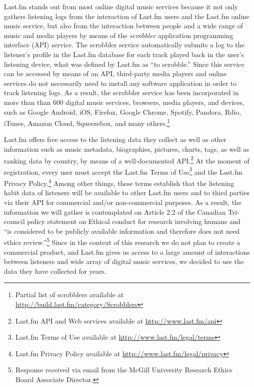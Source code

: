 Last.fm stands out from most online digital music services because it not only gathers listening logs from the interaction of Last.fm users and the Last.fm online music service, 
but also from the interaction between people and a wide range of music and media players by means of the \emph{scrobbler} application programming interface (API) service. 
The scrobbler service automatically submits a log to the listener's profile in the Last.fm database for each track played back in the user's listening device, what was defined by Last.fm as ``to scrobble.'' 
Since this service can be accessed by means of an API, third-party media players and online services do not necessarily need to install any software application in order to track listening logs.
As a result, the scrobbler service has been incorporated in more than than 600 digital music services, browsers, media players, and devices, such as Google Android, iOS,  Firefox, Google Chrome, Spotify, Pandora, Rdio, iTunes, Amazon Cloud, Squeezebox, and many others.\footnote{Partial list of scrobblers available at \url{http://build.last.fm/category/Scrobblers}} 

Last.fm offers free access to the listening data they collect as well as other information such as music metadata, biographies, pictures, charts, tags, as well as ranking data by country, by means of a well-documented API.\footnote{Last.fm API and Web services available at \url{http://www.last.fm/api}} 
At the moment of registration, every user must accept the Last.fm Terms of Use\footnote{Last.fm Terms of Use available at \url{http://www.last.fm/legal/terms}} and the Last.fm Privacy Policy.\footnote{Last.fm Privacy Policy available at \url{http://www.last.fm/legal/privacy}} Among other things, these terms establish that the listening habit data of listeners will be available to other Last.fm users and to third parties via their API for commercial and/or non-commercial purposes.
As a result, the information we will gather is contemplated on Article 2.2 of the Canadian Tri-council policy statement on Ethical conduct for research involving humans \autocite{TCPS14ethics} 
and ``is considered to be publicly available information and therefore does not need ethics review.''\footnote{Response received via email from the McGill University Research Ethics Board Associate Director.}
Since in the context of this research we do not plan to create a commercial product, and Last.fm gives us access to a large amount of interactions between listeners and wide array of digital music services, we decided to use the data they have collected for years.


